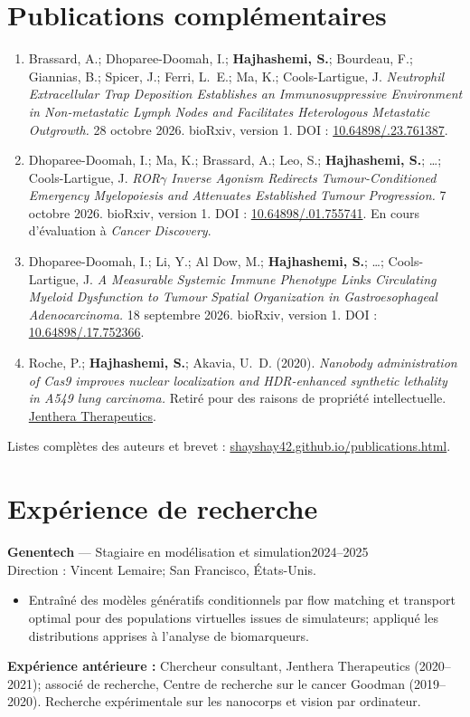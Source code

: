 \documentclass[11pt,letterpaper]{article}
\newcommand{\me}{\textbf{Hajhashemi, S.}}
\begin{document}
\section*{Publications complémentaires}
\begin{enumerate}[start=7,leftmargin=1.2em,itemsep=7pt,topsep=2pt,parsep=0pt]
\item Brassard, A.; Dhoparee-Doomah, I.; \me; Bourdeau, F.; Giannias, B.; Spicer, J.; Ferri, L.~E.; Ma, K.; Cools-Lartigue, J.
\textit{Neutrophil Extracellular Trap Deposition Establishes an Immunosuppressive Environment in Non-metastatic Lymph Nodes and Facilitates Heterologous Metastatic Outgrowth.}
28 octobre 2026. bioRxiv, version 1. DOI : \href{https://doi.org/10.64898/2026.10.23.761387}{10.64898/.23.761387}.

\item Dhoparee-Doomah, I.; Ma, K.; Brassard, A.; Leo, S.; \me; \ldots; Cools-Lartigue, J.
\textit{ROR$\gamma$ Inverse Agonism Redirects Tumour-Conditioned Emergency Myelopoiesis and Attenuates Established Tumour Progression.}
7 octobre 2026. bioRxiv, version 1. DOI : \href{https://doi.org/10.64898/2026.10.01.755741}{10.64898/.01.755741}.
En cours d'évaluation à \textit{Cancer Discovery}.
\item Dhoparee-Doomah, I.; Li, Y.; Al Dow, M.; \me; \ldots; Cools-Lartigue, J.
\textit{A Measurable Systemic Immune Phenotype Links Circulating Myeloid Dysfunction to Tumour Spatial Organization in Gastroesophageal Adenocarcinoma.}
18 septembre 2026. bioRxiv, version 1. DOI : \href{https://doi.org/10.64898/2026.09.17.752366}{10.64898/.17.752366}.
\item Roche, P.; \me; Akavia, U.~D. (2020).
\textit{Nanobody administration of Cas9 improves nuclear localization and HDR-enhanced synthetic lethality in A549 lung carcinoma.}
Retiré pour des raisons de propriété intellectuelle. \href{https://www.jenthera.com/}{Jenthera Therapeutics}.
\end{enumerate}
Listes complètes des auteurs et brevet : \href{https://shayshay42.github.io/publications.html}{shayshay42.github.io/publications.html}.

\newpage
\section*{Expérience de recherche}
\textbf{Genentech} — Stagiaire en modélisation et simulation\hfill 2024--2025\\
Direction : Vincent Lemaire; San Francisco, États-Unis.
\begin{itemize}
\item Entraîné des modèles génératifs conditionnels par flow matching et transport optimal pour des populations virtuelles issues de simulateurs; appliqué les distributions apprises à l'analyse de biomarqueurs.
\end{itemize}
\textbf{Expérience antérieure :} Chercheur consultant, Jenthera Therapeutics (2020--2021); associé de recherche, Centre de recherche sur le cancer Goodman (2019--2020). Recherche expérimentale sur les nanocorps et vision par ordinateur.
\end{document}
